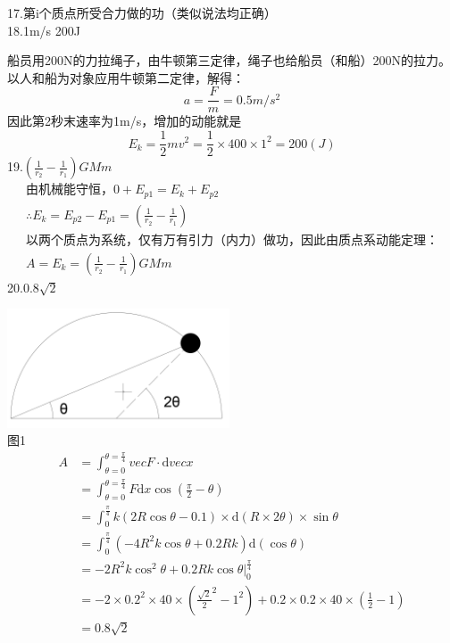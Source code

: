 \documentclass[blue, pad]{./templete/qyxfnote}
\newcommand{\di}[1]{\mathrm{d}#1}
\begin{document}
	17.第i个质点所受合力做的功（类似说法均正确）\\
	18.1m/s \qquad 200J\par
	船员用200N的力拉绳子，由牛顿第三定律，绳子也给船员（和船）200N的拉力。以人和船为对象应用牛顿第二定律，解得：
	\[a=\frac{F}{m}=0.5m/s^2\]
	因此第2秒末速率为1m/s，增加的动能就是
	\[E_k=\frac{1}{2}mv^2=\frac{1}{2}\times400\times1^2=200(J)\]
	19.$\left(\frac{1}{r_2}-\frac{1}{r_1}\right)GMm$ 
	\begin{gather*}
	\text{由机械能守恒，}0+E_{p1}=E_k+E_{p2}\\
	\therefore E_k=E_{p2}-E_{p1}=\left(\frac{1}{r_2}-\frac{1}{r_1}\right)\\
	\text{以两个质点为系统，仅有万有引力（内力）做功，因此由质点系动能定理：}\\
	A=E_k=\left(\frac{1}{r_2}-\frac{1}{r_1}\right)GMm
	\end{gather*}
	20.$0.8\sqrt{2}$\par
	\centering\includegraphics[height=100pt]{Chp2_illus1.png}\\
	图1
	\begin{align*}
	A	&=\int_{\theta=0}^{\theta=\frac{\pi}{4}}{vec{F}}\cdot\di{vec{x}}\\
	&=\int_{\theta=0}^{\theta=\frac{\pi}{4}}F\di{x}\cos\left(\frac{\pi}{2}-\theta\right)\\
	&=\int_{0}^{\frac{\pi}{4}}k(2R\cos\theta-0.1)\times\di{(R\times 2\theta)}\times\sin\theta\\
	&=\int_{0}^{\frac{\pi}{4}}(-4R^2k\cos\theta+0.2Rk)\di{(\cos\theta)}\\
	&=-2R^2k\cos^2\theta+0.2Rk\cos\theta\left.\right|_0^{\frac{\pi}{4}}\\
	&=-2\times 0.2^2\times 40\times({\frac{\sqrt{2}}{2}}^2-1^2)+0.2\times 0.2\times 40\times(\frac{1}{2}-1)\\
	&=0.8\sqrt{2}
	\end{align*}
	\raggedright
\end{document}
